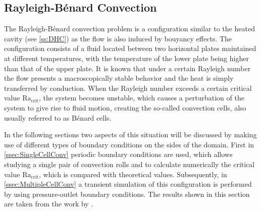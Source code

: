 \subsection{Rayleigh-Bénard Convection}\label{ssec:RayBer}

The Rayleigh-Bénard convection problem is a configuration similar to the heated cavity (see \cref{ss:DHC}) as the flow is also induced by bouyancy effects. The configuration consists of a fluid located between two horizontal plates maintained at different temperatures, with the temperature of the lower plate being higher than that of the upper plate. It is known that under a certain Rayleigh number the flow presents a macroscopically stable behavior and the heat is simply transferred by conduction. When the Rayleigh number exceeds a certain critical value $\text{Ra}_{\text{crit}}$, the system becomes unstable, which causes a perturbation of the system to give rise to fluid motion, creating the so-called convection cells, also usually referred to as Bénard cells.

In the following sections two aspects of this situation will be discussed by making use of different types of boundary conditions on the sides of the domain. First in \cref{ssec:SingleCellConv} periodic boundary conditions are used, which allows studying a single pair of convection rolls and to calculate numerically the critical value $\text{Ra}_{\text{crit}}$, which is compared with theoretical values. Subsequently, in \cref{ssec:MultipleCellConv} a transient simulation of this configuration is performed by using pressure-outlet boundary conditions. The results shown in this section are taken from the work by \textcite{miaoHighOrderSimulationLowMachFlows2022}.

